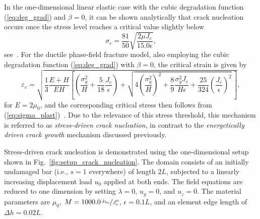 \documentclass[pdflatex,sn-mathphys-num]{sn-jnl}%
\theoremstyle{thmstyleone}%
\theoremstyle{thmstyletwo}%
\theoremstyle{thmstylethree}%
\begin{document}
In the one-dimensional linear elastic case with the cubic degradation function (\ref{eq:deg_grad}) and $\beta = 0$, it can be shown analytically that crack nucleation occurs once the stress level reaches a critical value slightly below
\begin{equation}
    \sigma_c = \dfrac{81}{50}\sqrt{\dfrac{2\mu J_c}{15.0\epsilon}},
    \label{eq:sig_c}
\end{equation}
see~\cite{schlueter_phase_2018}. For the ductile phase-field fracture model, also employing the cubic degradation function (\ref{eq:deg_grad}) with $\beta = 0$, the critical strain is given by
\begin{equation}
    \varepsilon_c = \sqrt{\dfrac{1}{3} \dfrac{E+H}{EH}
    \left[\left(\dfrac{\sigma_y^2}{H} + \dfrac{5}{18}\dfrac{J_c}{\epsilon}\right)
    + \sqrt{4\left(\dfrac{\sigma_y^2}{H}\right)^2
    + \dfrac{8}{9} \dfrac{\sigma_y^2 J_c}{H\epsilon}
    + \dfrac{25}{324} \left(\dfrac{J_c}{\epsilon}\right)^2}\,\right]},
    \label{eq:ductile_fracture_strain}
\end{equation}
for $E = 2\mu_0$, and the corresponding critical stress then follows from (\ref{eq:sigma_plast})~\cite{noll_3d_2020}.  Due to the relevance of this stress threshold, this mechanism is referred to as \textsl{stress-driven crack nucleation}, in contrast to the \textsl{energetically driven crack growth} mechanism discussed previously.

Stress-driven crack nucleation is demonstrated using the one-dimensional setup shown in Fig.~\ref{fig:setup_crack_nucleation}. The domain consists of an initially undamaged bar (i.e., $s = 1$ everywhere) of length $2L$, subjected to a linearly increasing displacement load $u_0$ applied at both ends. The field equations are reduced to one dimension by setting $\lambda = 0$, $u_y = 0$, and $u_z = 0$. The material parameters are $\mu_0$, $M = 1000.0\,\nicefrac{\dot{x}_{\text{bc}}}{J_c^0}$, $\epsilon = 0.1L$, and an element edge length of $\Delta h = 0.02L$.
\end{document}
